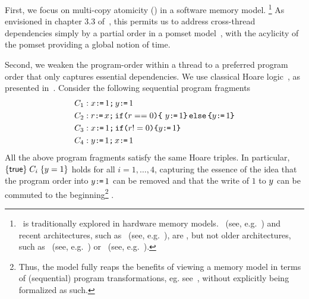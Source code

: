 First, we focus on  multi-copy atomicity (\mca) in a software memory model. \footnote{\mca\ is traditionally explored in hardware memory models.   \tso\ (see, e.g.~\cite{DBLP:journals/cacm/SewellSONM10}) and recent architectures, such as \armeight\ (see, e.g.~\cite{DBLP:journals/pacmpl/PulteFDFSS18}), are \mca, but not older architectures, such as \ppc\ (see, e.g.~\cite{DBLP:conf/pldi/SarkarSAMW11}) or \armseven\ (see, e.g.~\cite{DBLP:conf/popl/AlglaveFIMSSN09}).}  As envisioned in chapter 3.3 of~\citet{AlglaveThesis},  this permits us to address cross-thread dependencies simply by a partial order in a pomset model~\citep{GISCHER1988199,Plotkin:1997:TSP:266557.266600}, with the acylicity of the pomset providing a global notion of time.  

Second, we weaken the program-order within a thread to a preferred program order that only captures essential dependencies.  We use classical Hoare logic~\citep{Hoare:1969:ABC:363235.363259}, as presented in~\citet{gordonHoare}.  
Consider the following sequential program fragments
\begin{align*}
& C_1: x \texttt{:}\mkern-1mu\texttt{=}\, 1 \texttt{;}\,\allowbreak y \texttt{:}\mkern-1mu\texttt{=}\, 1 \\
& C_2: r \texttt{:}\mkern-1mu\texttt{=}\, x \texttt{;}\,\allowbreak \texttt{if}\allowbreak\texttt{(}r == 0\texttt{)} \allowbreak\texttt{\{}\ y \texttt{:}\mkern-1mu\texttt{=}\, 1 \texttt{\}}\,\allowbreak\texttt{else}\allowbreak\,\texttt{\{} y \texttt{:}\mkern-1mu\texttt{=}\, 1  \texttt{\}} \\
& C_3: x \texttt{:}\mkern-1mu\texttt{=}\, 1 \texttt{;}\,\allowbreak \texttt{if}\allowbreak\texttt{(}r != 0\texttt{)} \allowbreak\texttt{\{} y \texttt{:}\mkern-1mu\texttt{=}\, 1 \texttt{\}} \\
&C_4:  y \texttt{:}\mkern-1mu\texttt{=}\, 1 \texttt{;}\,\allowbreak x \texttt{:}\mkern-1mu\texttt{=}\, 1
\end{align*}
All the above program fragments satisfy the same Hoare triples.  In particular, $\{\mathsf{true}\}\allowbreak\;C_i\;\allowbreak\{y =1\}$ holds for all $i=1,\ldots,4$, capturing the essence of the idea that the program order into $y \texttt{:}\mkern-1mu\texttt{=}\, 1$ can be removed and that the write of $1$ to $y$ can be commuted to the beginning\footnote{Thus, the model fully reaps the benefits of viewing a memory model in terms of (sequential) program transformations, eg. see~\citep{Saraswat:2007:TMM:1229428.1229469,DBLP:conf/fm/LahavV16,
DBLP:conf/popl/DemangeLZJPV13,DBLP:conf/esop/FerreiraFS10}, without explicitly being formalized as such.} .


